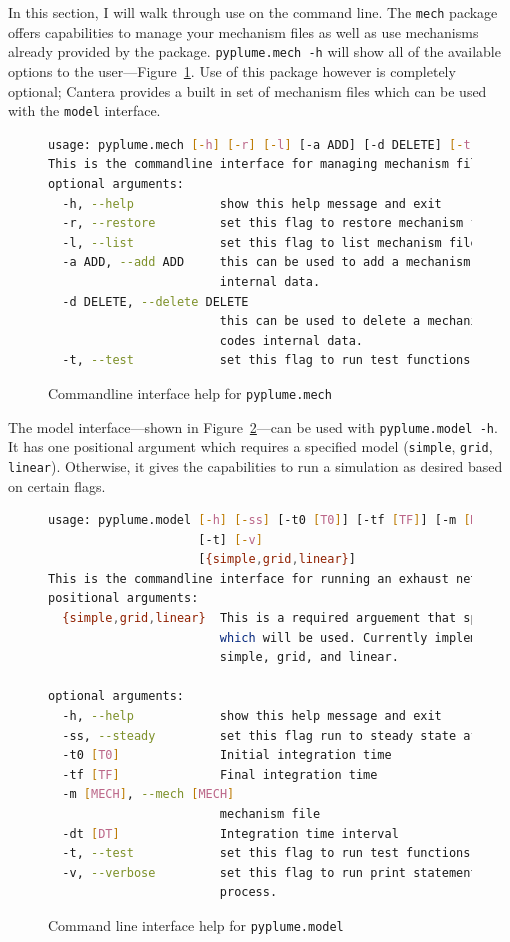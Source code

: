 \documentclass[smallextended,referee]{svjour3}
\newenvironment{codeblock}[1]
{
\begin{figure}[hbt]
\newcommand{\captionMacro}{#1}
\centering
\begin{tcolorbox}[width=15cm]
}
{
\end{tcolorbox}
\caption{\captionMacro{}}
\end{figure}
}
\begin{document}
In this section, I will walk through use on the command line. The \texttt{mech} package offers capabilities to manage your mechanism files as well as use mechanisms already provided by the package. \texttt{pyplume.mech -h} will show all of the available options to the user---Figure~\ref{code:mech}. Use of this package however is completely optional; Cantera provides a built in set of mechanism files which can be used with the \texttt{model} interface.

\begin{codeblock}{Commandline interface help for \texttt{pyplume.mech}}
\begin{lstlisting}[language=bash]
usage: pyplume.mech [-h] [-r] [-l] [-a ADD] [-d DELETE] [-t]
This is the commandline interface for managing mechanism files of PyPlume.
optional arguments:
  -h, --help            show this help message and exit
  -r, --restore         set this flag to restore mechanism files.
  -l, --list            set this flag to list mechanism files.
  -a ADD, --add ADD     this can be used to add a mechanism file to the codes
                        internal data.
  -d DELETE, --delete DELETE
                        this can be used to delete a mechanism file to the
                        codes internal data.
  -t, --test            set this flag to run test functions.
\end{lstlisting}
\label{code:mech}
\end{codeblock}

The model interface---shown in Figure~\ref{code:model}---can be used with \texttt{pyplume.model -h}. It has one positional argument which requires a specified model (\texttt{simple}, \texttt{grid}, \texttt{linear}). Otherwise, it gives the capabilities to run a simulation as desired based on certain flags.

\begin{codeblock}{Command line interface help for \texttt{pyplume.model}}
\begin{lstlisting}[language=bash]
usage: pyplume.model [-h] [-ss] [-t0 [T0]] [-tf [TF]] [-m [MECH]] [-dt [DT]]
                     [-t] [-v]
                     [{simple,grid,linear}]
This is the commandline interface for running an exhaust network.
positional arguments:
  {simple,grid,linear}  This is a required arguement that specifies the model
                        which will be used. Currently implemented choices are
                        simple, grid, and linear.

optional arguments:
  -h, --help            show this help message and exit
  -ss, --steady         set this flag run to steady state after integration
  -t0 [T0]              Initial integration time
  -tf [TF]              Final integration time
  -m [MECH], --mech [MECH]
                        mechanism file
  -dt [DT]              Integration time interval
  -t, --test            set this flag to run test functions.
  -v, --verbose         set this flag to run print statements during the
                        process.
\end{lstlisting}
\label{code:model}
\end{codeblock}
\end{document}
